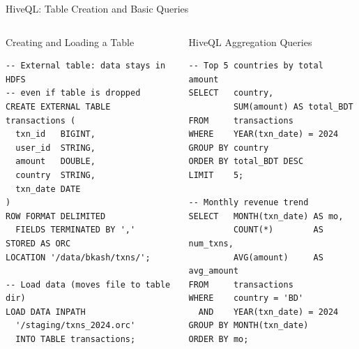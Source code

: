 \documentclass[aspectratio=169,10pt]{beamer}
\begin{document}
\begin{frame}[fragile]{HiveQL: Table Creation and Basic Queries}
  \begin{columns}[T]
      \begin{exampleblock}{Creating and Loading a Table}
        \begin{lstlisting}
-- External table: data stays in HDFS
-- even if table is dropped
CREATE EXTERNAL TABLE transactions (
  txn_id   BIGINT,
  user_id  STRING,
  amount   DOUBLE,
  country  STRING,
  txn_date DATE
)
ROW FORMAT DELIMITED
  FIELDS TERMINATED BY ','
STORED AS ORC
LOCATION '/data/bkash/txns/';

-- Load data (moves file to table dir)
LOAD DATA INPATH
  '/staging/txns_2024.orc'
  INTO TABLE transactions;
        \end{lstlisting}
      \end{exampleblock}

      \begin{exampleblock}{HiveQL Aggregation Queries}
        \begin{lstlisting}
-- Top 5 countries by total amount
SELECT   country,
         SUM(amount) AS total_BDT
FROM     transactions
WHERE    YEAR(txn_date) = 2024
GROUP BY country
ORDER BY total_BDT DESC
LIMIT    5;

-- Monthly revenue trend
SELECT   MONTH(txn_date) AS mo,
         COUNT(*)        AS num_txns,
         AVG(amount)     AS avg_amount
FROM     transactions
WHERE    country = 'BD'
  AND    YEAR(txn_date) = 2024
GROUP BY MONTH(txn_date)
ORDER BY mo;
        \end{lstlisting}
      \end{exampleblock}
  \end{columns}
\end{frame}
\end{document}
